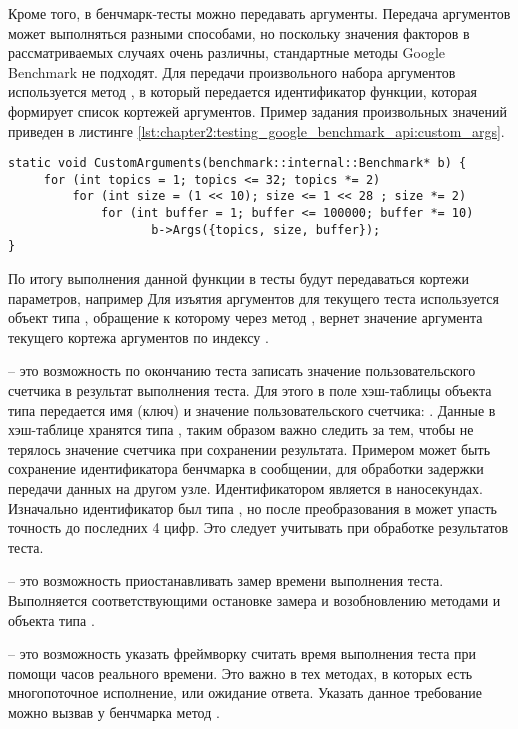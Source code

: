 \begin{description}[noitemsep]
	Кроме того, в бенчмарк-тесты можно передавать аргументы. Передача аргументов может выполняться разными способами, но поскольку значения факторов в рассматриваемых случаях очень различны, стандартные методы Google Benchmark не подходят. Для передачи произвольного набора аргументов используется метод , в который передается идентификатор функции, которая формирует список кортежей аргументов. Пример задания произвольных значений приведен в листинге \ref{lst:chapter2:testing_google_benchmark_api:custom_args}.
	\begin{lstlisting}[label=lst:chapter2:testing_google_benchmark_api:custom_args, caption={Описание функции, формирующей список кортежей аргументов для бенчмарк-теста}]
static void CustomArguments(benchmark::internal::Benchmark* b) {
     for (int topics = 1; topics <= 32; topics *= 2)
         for (int size = (1 << 10); size <= 1 << 28 ; size *= 2)
             for (int buffer = 1; buffer <= 100000; buffer *= 10)
                    b->Args({topics, size, buffer});
}
	\end{lstlisting}
	По итогу выполнения данной функции в тесты будут передаваться кортежи параметров, например  \etc{} Для изъятия аргументов для текущего теста используется объект типа , обращение к которому через метод , вернет значение аргумента текущего кортежа аргументов по индексу . 
	
	\item [Пользовательские счетчики] -- это возможность по окончанию теста записать значение пользовательского счетчика в результат выполнения теста. Для этого в поле хэш-таблицы  объекта типа  передается имя (ключ) и значение пользовательского счетчика: . Данные в хэш-таблице хранятся типа , таким образом важно следить за тем, чтобы не терялось значение счетчика при сохранении результата. Примером может быть сохранение идентификатора бенчмарка в сообщении, для обработки задержки передачи данных на другом узле. Идентификатором является  в наносекундах. Изначально идентификатор был типа , но после преобразования в  может упасть точность до последних 4 цифр. Это следует учитывать при обработке результатов теста.
	
	\item [Управление временем] -- это возможность приостанавливать замер времени выполнения теста. Выполняется соответствующими остановке замера и возобновлению методами  и  объекта типа .
	
	\item [Указание способа вычисления времени] -- это возможность указать фреймворку считать время выполнения теста при помощи часов реального времени. Это важно в тех методах, в которых есть многопоточное исполнение, или ожидание ответа. Указать данное требование можно вызвав у бенчмарка метод . 
\end{description}


